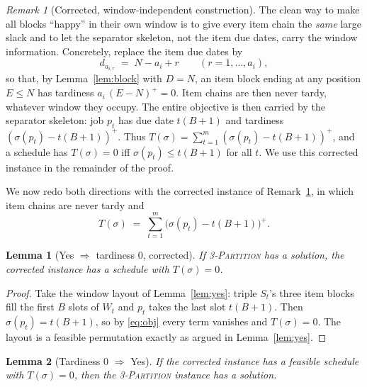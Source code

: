 \documentclass{amsart}
\newtheorem{lemma}{Lemma}
\theoremstyle{definition}
\theoremstyle{remark}
\newtheorem{remark}{Remark}
\begin{document}
\begin{remark}[Corrected, window-independent construction]\label{rem:offsets}
The clean way to make all blocks ``happy'' in their own window is to give every item chain
the \emph{same} large slack and to let the separator skeleton, not the item due dates,
carry the window information. Concretely, replace the item due dates by
\[
   d_{a_{i,r}} \;=\; N-a_i+r \qquad(r=1,\dots,a_i),
\]
so that, by Lemma~\ref{lem:block} with $D=N$, an item block ending at any position
$E\le N$ has tardiness $a_i\,(E-N)^{+}=0$. Item chains are then never tardy, whatever
window they occupy. The entire objective is then carried by the separator skeleton:
job $p_t$ has due date $t(B+1)$ and tardiness $(\sigma(p_t)-t(B+1))^{+}$. Thus
$T(\sigma)=\sum_{t=1}^m(\sigma(p_t)-t(B+1))^{+}$, and a schedule has $T(\sigma)=0$ iff
$\sigma(p_t)\le t(B+1)$ for all $t$. We use this corrected instance in the remainder of
the proof.
\end{remark}

We now redo both directions with the corrected instance of Remark~\ref{rem:offsets}, in
which item chains are never tardy and
\begin{equation}\label{eq:obj}
   T(\sigma)\;=\;\sum_{t=1}^{m}\bigl(\sigma(p_t)-t(B+1)\bigr)^{+}.
\end{equation}

\begin{lemma}[Yes $\Rightarrow$ tardiness $0$, corrected]\label{lem:yes2}
If \textsc{3-Partition} has a solution, the corrected instance has a schedule with
$T(\sigma)=0$.
\end{lemma}

\begin{proof}
Take the window layout of Lemma~\ref{lem:yes}: triple $S_t$'s three item blocks fill the
first $B$ slots of $W_t$ and $p_t$ takes the last slot $t(B+1)$. Then
$\sigma(p_t)=t(B+1)$, so by \eqref{eq:obj} every term vanishes and $T(\sigma)=0$. The
layout is a feasible permutation exactly as argued in Lemma~\ref{lem:yes}.
\end{proof}

\begin{lemma}[Tardiness $0$ $\Rightarrow$ Yes]\label{lem:no}
If the corrected instance has a feasible schedule with $T(\sigma)=0$, then the
\textsc{3-Partition} instance has a solution.
\end{lemma}
\end{document}
